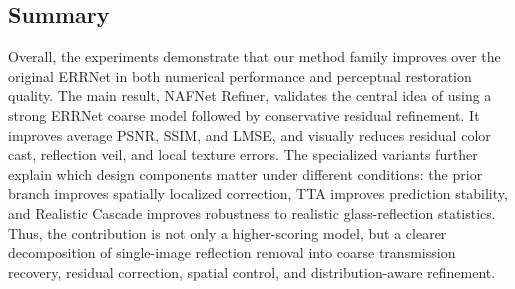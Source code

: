 \subsection{Summary}

Overall, the experiments demonstrate that our method family improves over the original ERRNet in both numerical performance and perceptual restoration quality. The main result, NAFNet Refiner, validates the central idea of using a strong ERRNet coarse model followed by conservative residual refinement. It improves average PSNR, SSIM, and LMSE, and visually reduces residual color cast, reflection veil, and local texture errors. The specialized variants further explain which design components matter under different conditions: the prior branch improves spatially localized correction, TTA improves prediction stability, and Realistic Cascade improves robustness to realistic glass-reflection statistics. Thus, the contribution is not only a higher-scoring model, but a clearer decomposition of single-image reflection removal into coarse transmission recovery, residual correction, spatial control, and distribution-aware refinement.
